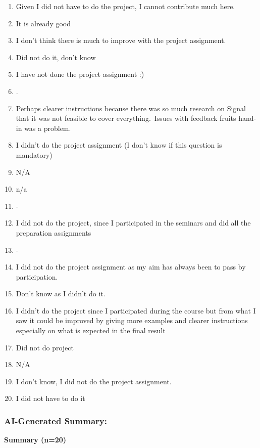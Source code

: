 \documentclass[a4paper]{report}
\begin{document}
\begin{enumerate}
  \item Given I did not have to do the project, I cannot contribute much here.
  \item It is already good
  \item I don't think there is much to improve with the project assignment.
  \item Did not do it, don't know
  \item I have not done the project assignment :)
  \item .
  \item Perhaps clearer instructions because there was so much research on Signal that it was not feasible to cover everything. Issues with feedback fruits hand-in was a problem.
  \item I didn't do the project assignment (I don't know if this question is mandatory)
  \item N/A
  \item n/a
  \item -
  \item I did not do the project, since I participated in the seminars and did all the preparation assignments
  \item -
  \item I did not do the project assignment as my aim has always been to pass by participation.
  \item Don't know as I didn't do it.
  \item I didn’t do the project since I participated during the course but from what I saw it could be improved by giving more examples and clearer instructions especially on what is expected in the final result
  \item Did not do project
  \item N/A
  \item I don't know, I did not do the project assignment.
  \item I did not have to do it
\end{enumerate}

\subsubsection{AI-Generated Summary:}

\textbf{Summary (n=20)}
\end{document}
